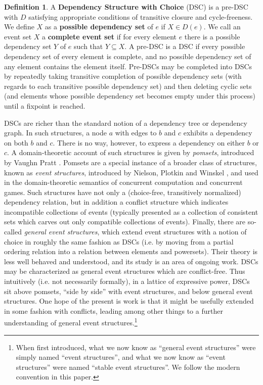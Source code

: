 \documentclass[hoptionsi,review,screen,format=sigconf]{acmart}
\theoremstyle{definition}
\newtheorem{definition}{Definition}[section]
\begin{document}
\begin{definition}
A \textbf{Dependency Structure with Choice} (DSC) is a pre-DSC with \(D\) satisfying  appropriate conditions of transitive closure and cycle-freeness. We define \(X\) as a \textbf{possible dependency set} of \(e\) if \(X \in D(e)\). We call an event set \(X\) a \textbf{complete event set} if for every element \(e\) there is a possible dependency set \(Y\) of \(e\) such that \(Y \subseteq X\). A pre-DSC is a DSC if every possible dependency set of every element is complete, and no possible dependency set of any element contains the element itself. Pre-DSCs may be completed into DSCs by repeatedly taking transitive completion of possible dependency sets (with regards to each transitive possible dependency set) and then deleting cyclic sets (and elements whose possible dependency set becomes empty under this process) until a fixpoint is reached.
\end{definition}

DSCs are richer than the standard notion of a dependency tree or dependency graph. In such structures, a node \(a\) with edges to \(b\) and \(c\) exhibits a dependency on both \(b\) and \(c\). There is no way, however, to express a dependency on either \(b\) or \(c\). A domain-theoretic account of such structures is given by \textit{pomsets}, introduced by Vaughn Pratt \cite{pratt1986modeling}. Pomsets are a special instance of a broader class of structures, known as \textit{event structures}, introduced by Nielson, Plotkin and Winskel \cite{nielsen1981petri}, and used in the domain-theoretic semantics of concurrent computation and concurrent games. Such structures have not only a (choice-free, transitively normalized) dependency relation, but in addition a conflict structure which indicates incompatible collections of events (typically presented as a collection of consistent sets which carves out only compatible collections of events). Finally, there are so-called \textit{general event structures}, which extend event structures with a notion of choice in roughly the same fashion as DSCs (i.e. by moving from a partial ordering relation into a relation between elements and powersets). Their theory is less well behaved and understood, and its study is an area of ongoing work. DSCs may be characterized as general event structures which are conflict-free. Thus intuitively (i.e. not necessarily formally), in a lattice of expressive power, DSCs sit above pomsets, ``side by side'' with event structures, and below general event structures. One hope of the present is work is that it might be usefully extended in some fashion with conflicts, leading among other things to a further understanding of general event structures.\footnote{When first introduced, what we now know as ``general event structures'' were simply named ``event structures'', and what we now know as ``event structures'' were named ``stable event structures''. We follow the modern convention in this paper.}
\end{document}
